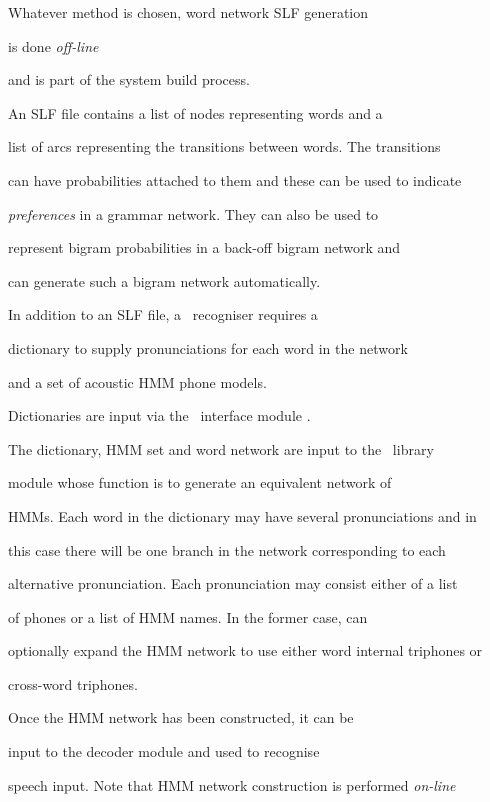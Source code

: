Whatever method is chosen, word network SLF generation 


is done \textit{off-line}


and is part of the system build process.





An SLF file contains a list of nodes representing words and a


list of arcs representing the transitions between words.   The transitions


can have probabilities attached to them and these can be used to indicate


\textit{preferences} in a grammar network.  They can also be used to


represent bigram probabilities in a back-off bigram network and 


 can generate such a bigram network automatically.


In addition to an SLF file, a \HTK\ recogniser requires a 


dictionary to supply pronunciations for each word in the network


and a set of acoustic HMM phone models. 


Dictionaries are input via the \HTK\ interface module .





The dictionary, HMM set and word network are input to the \HTK\ library


module  whose function is to generate an equivalent network of


HMMs. Each word in the dictionary may have several pronunciations and in


this case there will be one branch in the network corresponding to each


alternative pronunciation. Each pronunciation may consist either of a list


of phones or a list of HMM names. In the former case,  can


optionally expand the HMM network to use either word internal triphones or


cross-word triphones.


Once the HMM network has been constructed, it can be


input to the decoder module  and used to recognise


speech input.  Note that HMM network construction is performed \textit{on-line}


